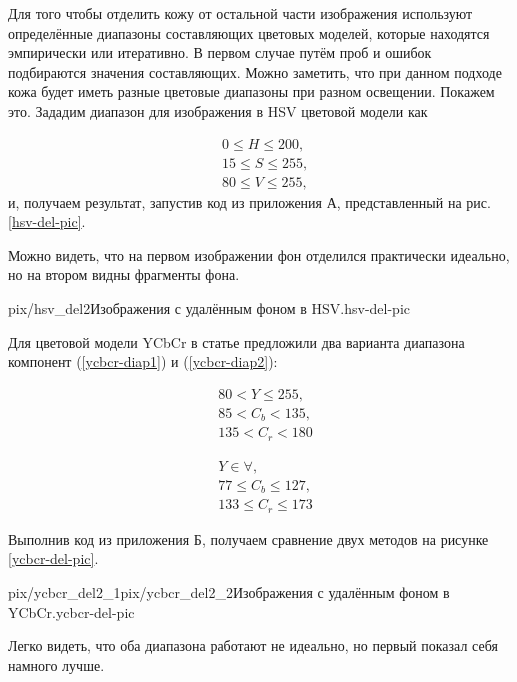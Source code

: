 Для того чтобы отделить кожу от остальной части изображения 
используют определённые диапазоны составляющих цветовых моделей, 
которые находятся эмпирически или итеративно. В первом случае путём 
проб и ошибок подбираются значения составляющих. Можно заметить,
что при данном подходе кожа будет иметь разные цветовые диапазоны
при разном освещении. Покажем это. Зададим диапазон для 
изображения в HSV цветовой модели как

$$
\begin{aligned}
	&0 \leq H \leq 200, \\
	&15 \leq S \leq 255, \\
	&80 \leq V \leq 255,
\end{aligned}
$$
и, получаем результат, запустив код из приложения А, представленный на рис. \ref{hsv-del-pic}.

Можно видеть, что на первом изображении фон отделился практически 
идеально, но на втором видны фрагменты фона.

{pix/hsv_del2}{Изображения  с удалённым фоном в HSV.}{hsv-del-pic}

Для цветовой модели YCbCr в статье \cite{ycbcr-bib} предложили два 
варианта диапазона компонент (\ref{ycbcr-diap1}) и (\ref{ycbcr-diap2}):

\begin{equation}
	\begin{aligned}
		&80 < Y \leq 255, \\
		&85 < C_b < 135, \\
		&135 < C_r < 180 
	\end{aligned}
	\label{ycbcr-diap1}
\end{equation}

\begin{equation}
	\begin{aligned}
		&Y \in \forall,\\
		&77 \leq C_b \leq 127, \\
		&133 \leq C_r \leq 173 
	\end{aligned}
	\label{ycbcr-diap2}
\end{equation}

Выполнив код из приложения Б, получаем сравнение двух методов на рисунке \ref{ycbcr-del-pic}.

{pix/ycbcr_del2_1}{pix/ycbcr_del2_2}{Изображения с удалённым
фоном в YCbCr.}{ycbcr-del-pic}

Легко видеть, что оба диапазона работают не идеально, но первый 
показал себя намного лучше. 

